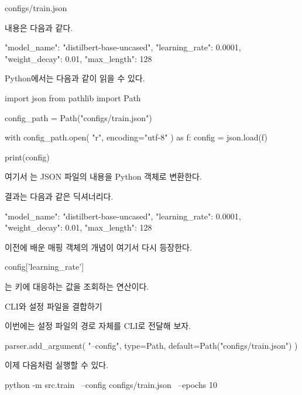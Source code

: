\begin{dhkzsh}
configs/train.json
\end{dhkzsh}

내용은 다음과 같다.

\begin{dhkzsh}
{
    "model_name": "distilbert-base-uncased",
    "learning_rate": 0.0001,
    "weight_decay": 0.01,
    "max_length": 128
}
\end{dhkzsh}

Python에서는 다음과 같이 읽을 수 있다.

\begin{dhkcode}
import json
from pathlib import Path

config_path = Path("configs/train.json")

with config_path.open(
    "r",
    encoding="utf-8"
) as f:
    config = json.load(f)

print(config)
\end{dhkcode}

여기서 는 JSON 파일의 내용을 Python 객체로 변환한다.

결과는 다음과 같은 딕셔너리다.

\begin{dhkzsh}
{
    "model_name": "distilbert-base-uncased",
    "learning_rate": 0.0001,
    "weight_decay": 0.01,
    "max_length": 128
}
\end{dhkzsh}

이전에 배운 매핑 객체의 개념이 여기서 다시 등장한다.

\begin{dhkzsh}
config['learning_rate']
\end{dhkzsh}

는  키에 대응하는 값을 조회하는 연산이다.

\begin{dhknote}
\begin{dhksmry}[centered]
CLI와 설정 파일을 결합하기
\end{dhksmry}
\end{dhknote}

이번에는 설정 파일의 경로 자체를 CLI로 전달해 보자.

\begin{dhkcode}
parser.add_argument(
    "--config",
    type=Path,
    default=Path("configs/train.json")
)
\end{dhkcode}

이제 다음처럼 실행할 수 있다.

\begin{dhkzsh}
python -m src.train \
    --config configs/train.json \
    --epochs 10
\end{dhkzsh}

